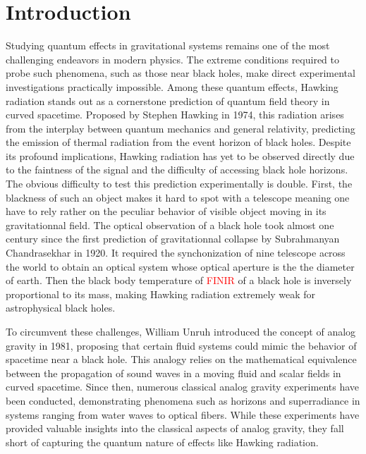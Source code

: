 

\chapter{Introduction}
\label{chap:introduction}

Studying quantum effects in gravitational systems remains one of the most challenging endeavors in modern physics. 
The extreme conditions required to probe such phenomena, such as those near black holes, make direct experimental investigations practically impossible. 
Among these quantum effects, Hawking radiation stands out as a cornerstone prediction of quantum field theory in curved spacetime. Proposed by Stephen Hawking in 1974, this radiation arises from the interplay between quantum mechanics and general relativity, predicting the emission of thermal radiation from the event horizon of black holes. Despite its profound implications, Hawking radiation has yet to be observed directly due to the faintness of the signal and the difficulty of accessing black hole horizons.
 The obvious difficulty to test this prediction experimentally is double. First, the blackness of such an object makes it hard to spot with a telescope meaning one have to rely rather on the peculiar behavior of visible object moving in its gravitationnal field. The optical observation of a black hole took almost one century since the first prediction of gravitationnal collapse by Subrahmanyan Chandrasekhar in 1920. It required 
the synchonization of nine telescope across the world to obtain an optical system whose optical aperture is the the diameter of earth. Then the black body temperature of \textcolor{red}{FINIR} of a black hole is inversely proportional to its mass, making Hawking radiation extremely weak for astrophysical black holes.

To circumvent these challenges, William Unruh introduced the concept of analog gravity in 1981, proposing that certain fluid systems could mimic the behavior of spacetime near a black hole. 
This analogy relies on the mathematical equivalence between the propagation of sound waves in a moving fluid and scalar fields in curved spacetime. 
Since then, numerous classical analog gravity experiments have been conducted, demonstrating phenomena such as horizons and superradiance in systems ranging from water waves to optical fibers. While these experiments have provided valuable insights into the classical aspects of analog gravity, they fall short of capturing the quantum nature of effects like Hawking radiation.

